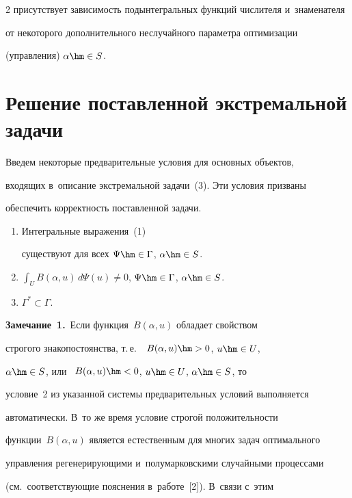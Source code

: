 \begin{multicols}{2}
присутствует зависимость подынтегральных функций чис\-ли\-те\-ля и~знаменателя 

от некоторого дополнительного неслучайного параметра оптимизации 

(управ\-ле\-ния) $\alpha\hm\in S$. 



\section{Решение поставленной экстремальной задачи}



     Введем некоторые предварительные условия для основных объектов, 

входящих в~описание экстремальной задачи~(3). Эти условия призваны 

обеспечить корректность по\-став\-лен\-ной задачи.

     \begin{enumerate}[1.]

\item Интегральные выражения~(1) 

существуют для всех $\Psi\hm\in \Gamma$, $\alpha\hm\in S$.

\item $\int\nolimits_U B(\alpha,u)\,d\Psi(u)\not= 0$, $\Psi\hm\in 

\Gamma$, $\alpha\hm\in S$. 

\item $\Gamma^*\subset \Gamma$.

\end{enumerate}



\noindent

     \textbf{Замечание~1.}\ Если функция~$B(\alpha, u)$ обладает свойством 

строгого знакопостоянства, т.\,е.\ ~$B(\alpha, u)\hm>0$, $u\hm\in U$, 

$\alpha\hm\in S$, или ~$B(\alpha, u) \hm<0$, $u\hm\in U$, $\alpha\hm\in S$, то 

условие~2 из указанной сис\-те\-мы предварительных условий выполняется 

автоматически. В~то же время условие строгой по\-ло\-жи\-тель\-ности 

функции~$B(\alpha, u)$ является естественным для многих задач оптимального 

управления регенерирующими и~полумарковскими случайными процессами 

(см.\ соответствующие пояснения в~работе~[2]). В~связи с~этим 


\end{multicols}
